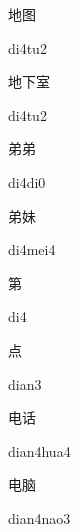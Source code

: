 \begin{multicols*}{2}
\begin{verbete}[di4tu2]{地图}
\begin{pronuncia}{di4tu2}
\end{pronuncia}
\end{verbete}

\begin{verbete}{地下室}
\begin{pronuncia}{di4tu2}
\end{pronuncia}
\end{verbete}

\begin{verbete}[di4di0]{弟弟}
\begin{pronuncia}{di4di0}
\end{pronuncia}
\end{verbete}

\begin{verbete}[di4mei4]{弟妹}
\begin{pronuncia}{di4mei4}
\end{pronuncia}
\end{verbete}

\begin{verbete}[di4]{第}
\begin{pronuncia}{di4}
\end{pronuncia}
\end{verbete}

\begin{verbete}[dian3]{点}
\begin{pronuncia}{dian3}
\end{pronuncia}
\end{verbete}

\begin{verbete}{电话}
\begin{pronuncia}{dian4hua4}
\end{pronuncia}
\end{verbete}

\begin{verbete}{电脑}
\begin{pronuncia}{dian4nao3}
\end{pronuncia}
\end{verbete}


\end{multicols*}

